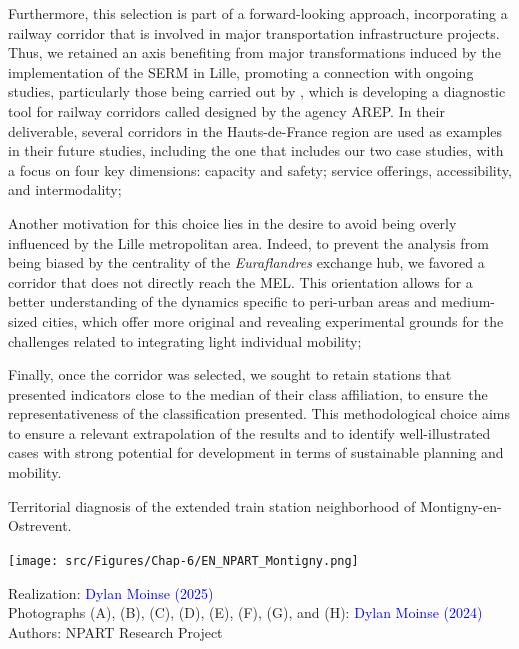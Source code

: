 \begin{refsegment}
\begin{customitemize}
    \item Furthermore, this selection is part of a forward-looking approach, incorporating a railway corridor that is involved in major transportation infrastructure projects. Thus, we retained an axis benefiting from major transformations induced by the implementation of the \acrfull{SERM} in Lille, promoting a connection with ongoing studies, particularly those being carried out by \textcolor{blue}{\textcite[3]{sncf_gares__connexions_connecter_2024}}, which is developing a diagnostic tool for railway corridors called  designed by the agency \acrfull{AREP}. In their deliverable, several corridors in the Hauts-de-France region are used as examples in their future studies, including the one that includes our two case studies, with a focus on four key dimensions: capacity and safety; service offerings, accessibility, and intermodality;
    \item Another motivation for this choice lies in the desire to avoid being overly influenced by the Lille metropolitan area. Indeed, to prevent the analysis from being biased by the centrality of the \textsl{Euraflandres} exchange hub, we favored a corridor that does not directly reach the \acrshort{MEL}. This orientation allows for a better understanding of the dynamics specific to peri-urban areas and medium-sized cities, which offer more original and revealing experimental grounds for the challenges related to integrating light individual mobility;
    \item Finally, once the corridor was selected, we sought to retain stations that presented indicators close to the median of their class affiliation, to ensure the representativeness of the classification presented. This methodological choice aims to ensure a relevant extrapolation of the results and to identify well-illustrated cases with strong potential for development in terms of sustainable planning and mobility.
\end{customitemize}%

    \begin{carte}[h!]\vspace*{4pt}
        \caption{Territorial diagnosis of the extended train station neighborhood of Montigny-en-Ostrevent.}
        \label{fig-chap6:monographie-montigny}
        \centerline{\texttt{[image: src/Figures/Chap-6/EN\_NPART\_Montigny.png]}}
        \vspace{5pt}
        \begin{flushright}\scriptsize{
        Realization: \textcolor{blue}{Dylan Moinse (2025)}
        \\
        Photographs (A), (B), (C), (D), (E), (F), (G), and (H): \textcolor{blue}{Dylan Moinse (2024)}
        \\
        Authors: \acrshort{NPART} Research Project
        }\end{flushright}
    \end{carte}


\end{refsegment}
